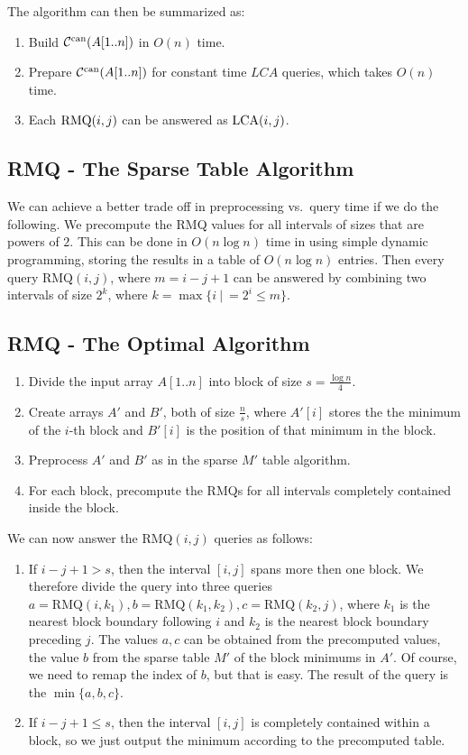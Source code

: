 The algorithm can then be summarized as:
\begin{enumerate}
    \item Build $\mathcal{C}^{\text{can}}(A[1..n])$ in $O(n)$ time.
    \item Prepare $\mathcal{C}^{\text{can}}(A[1..n])$ for constant time $LCA$ queries, which takes $O(n)$ time.
    \item Each $\text{RMQ}(i, j)$ can be answered as $\text{LCA}(i, j)$.
\end{enumerate}


\hypertarget{rmq---overlapping-intervals}{%
\subsection{RMQ - The Sparse Table Algorithm}\label{rmq---overlapping-intervals}}

We can achieve a better trade off in preprocessing vs.~query time if we do the following.
We precompute the RMQ values for all intervals of sizes that are powers of $2$.
This can be done in $O(n \log n)$ time in using simple dynamic programming, storing the results in a table of $O(n \log n)$ entries.
Then every query $\text{RMQ}(i, j)$, where $m = i-j+1$ can be answered by combining two intervals of size $2^k$, where $k = \max \{i ~|~ = 2^i \leq m\}$.

\subsection{RMQ - The Optimal Algorithm}
\begin{enumerate}
    \item Divide the input array $A[1..n]$ into block of size $s = \frac{\log n}{4}$.
    \item Create arrays $A'$ and $B'$, both of size $\frac{n}{s}$, where $A'[i]$ stores the the minimum of the $i$-th block and $B'[i]$ is the position of that minimum in the block. 
    \item Preprocess $A'$ and $B'$ as in the sparse $M'$ table algorithm. \label{rmq:step3}
    \item For each block, precompute the RMQs for all intervals completely contained inside the block.
\end{enumerate}

We can now answer the $\text{RMQ}(i, j)$ queries as follows:
\begin{enumerate}
    \item If $i-j+1 > s$, then the interval $[i,j]$ spans more then one block. We therefore divide the query into three queries $a  = \text{RMQ}(i, k_1), b = \text{RMQ}(k_1, k_2), c = \text{RMQ}(k_2, j)$, where $k_1$ is the nearest block boundary following $i$ and $k_2$ is the nearest block boundary preceding $j$. The values $a, c$ can be obtained from the precomputed values, the value $b$ from the sparse table $M'$ of the block minimums in $A'$. Of course, we need to remap the index of $b$, but that is easy. The result of the query is the $\min \{a,b,c\}$.
    \item If $i-j+1 \leq s$, then the interval $[i,j]$ is completely contained within a block, so we just output the minimum according to the precomputed table.
\end{enumerate}

